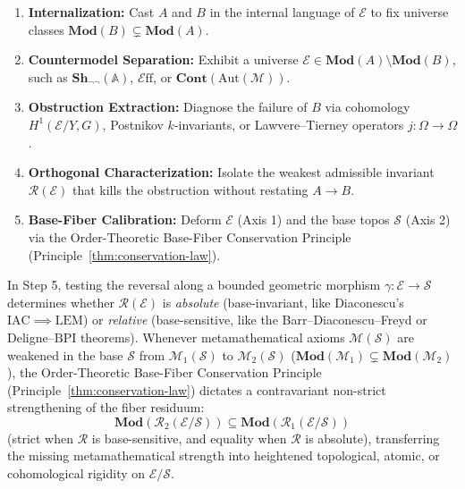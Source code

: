 \documentclass[10pt,twoside,openright]{book}
\theoremstyle{crmplain}
\theoremstyle{crmdef}
\theoremstyle{crmremark}
\newcommand{\Eff}{\mathcal{E}\mathrm{ff}}
\begin{document}
\begin{enumerate}[label=\textbf{Step \arabic*:},leftmargin=4.2em]

  \item \textbf{Internalization:} Cast $A$ and $B$ in the internal language of $\mathcal{E}$ to fix universe classes $\mathbf{Mod}(B) \subsetneq \mathbf{Mod}(A)$.

  \item \textbf{Countermodel Separation:} Exhibit a universe $\mathcal{E} \in \mathbf{Mod}(A) \setminus \mathbf{Mod}(B)$, such as $\mathbf{Sh}_{\neg\neg}(\mathbb{A})$, $\Eff$, or $\mathbf{Cont}(\mathrm{Aut}(\mathcal{M}))$.

  \item \textbf{Obstruction Extraction:} Diagnose the failure of $B$ via cohomology $H^1(\mathcal{E}/Y, G)$, Postnikov $k$-invariants, or Lawvere--Tierney operators $j: \Omega \to \Omega$.

  \item \textbf{Orthogonal Characterization:} Isolate the weakest admissible invariant $\mathcal{R}(\mathcal{E})$ that kills the obstruction without restating $A \to B$.

  \item \textbf{Base-Fiber Calibration:} Deform $\mathcal{E}$ (Axis 1) and the base topos $\mathcal{S}$ (Axis 2) via the Order-Theoretic Base-Fiber Conservation Principle (Principle~\ref{thm:conservation-law}).

\end{enumerate}

In Step 5, testing the reversal along a bounded geometric morphism $\gamma: \mathcal{E} \to \mathcal{S}$ determines whether $\mathcal{R}(\mathcal{E})$ is \emph{absolute} (base-invariant, like Diaconescu's $\mathrm{IAC} \implies \mathrm{LEM}$) or \emph{relative} (base-sensitive, like the Barr--Diaconescu--Freyd or Deligne--$\mathrm{BPI}$ theorems). Whenever metamathematical axioms $\mathcal{M}(\mathcal{S})$ are weakened in the base $\mathcal{S}$ from $\mathcal{M}_1(\mathcal{S})$ to $\mathcal{M}_2(\mathcal{S})$ ($\mathbf{Mod}(\mathcal{M}_1) \subsetneq \mathbf{Mod}(\mathcal{M}_2)$), the Order-Theoretic Base-Fiber Conservation Principle (Principle~\ref{thm:conservation-law}) dictates a contravariant non-strict strengthening of the fiber residuum:
\[
  \mathbf{Mod}(\mathcal{R}_2(\mathcal{E}/\mathcal{S})) \subseteq \mathbf{Mod}(\mathcal{R}_1(\mathcal{E}/\mathcal{S}))
\]
(strict when $\mathcal{R}$ is base-sensitive, and equality when $\mathcal{R}$ is absolute), transferring the missing metamathematical strength into heightened topological, atomic, or cohomological rigidity on $\mathcal{E}/\mathcal{S}$.
\end{document}
